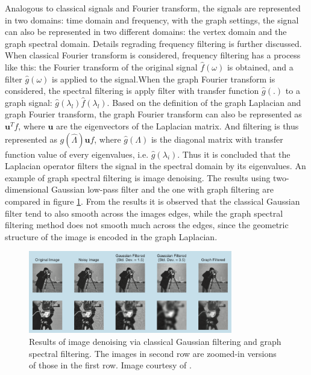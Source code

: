 \documentclass[conference]{IEEEtran}
\begin{document}
Analogous to classical signals and Fourier transform, the signals are represented in two domains: time domain and frequency, with the graph settings, the signal can also be represented in two different domains: the vertex domain and the graph spectral domain. 
Details regrading frequency filtering is further discussed. When classical Fourier transform is considered, frequency filtering has a process like this: the Fourier transform of the original signal $\hat{f}(\omega)$ is obtained, and a filter $\hat{g}(\omega)$ is applied to the signal.When the graph Fourier transform is considered, the spectral filtering is apply filter with transfer function $\hat{g}(.)$ to a graph signal: $\hat{g}(\lambda_l)\hat{f}(\lambda_l)$. Based on the definition of the graph Laplacian and graph Fourier transform, the graph Fourier transform can also be represented as $\mathbf{u}^Tf$, where $\mathbf{u}$ are the eigenvectors of the Laplacian matrix. And filtering is thus represented as $g(\hat{\Lambda})\mathbf{u}f$, where $\hat{g}(\Lambda)$ is the diagonal matrix with transfer function value of every eigenvalues, i.e. $\hat{g}(\lambda_i)$. Thus it is concluded that the Laplacian operator filters the signal in the spectral domain by its eigenvalues. An example of graph spectral filtering is image denoising. The results using two-dimensional Gaussian low-pass filter and the one with graph filtering are compared in figure \ref{3}. From the results it is observed that the classical Gaussian filter tend to also smooth across the images edges, while the graph spectral filtering method does not smooth much across the edges, since the geometric structure of the image is encoded in the graph Laplacian.\\
\begin{figure}[htbp]
\centerline{\includegraphics[width=3.5in]{3.png}}
\caption{Results of image denoising via classical Gaussian filtering and graph spectral filtering. The images in second row are zoomed-in versions of those in the first row. Image courtesy of \cite{b1}.}
\label{3}
\end{figure}
\end{document}
